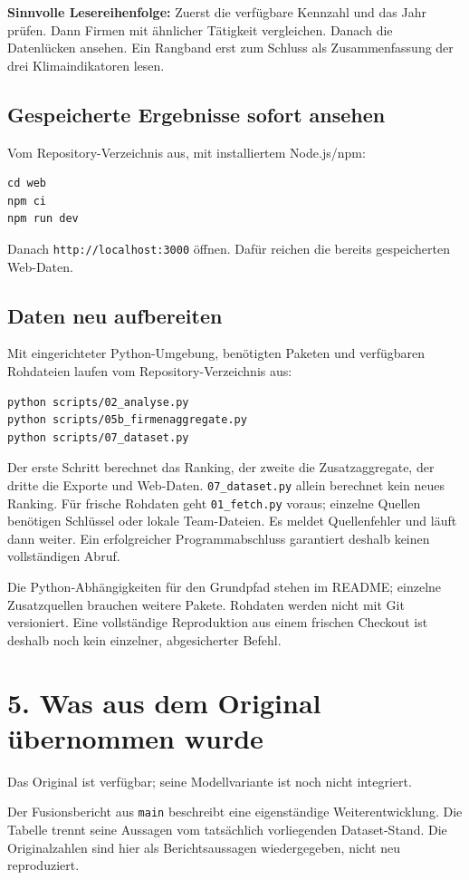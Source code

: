 \documentclass[11pt,a4paper]{article}
\newcommand{\lead}[1]{{\large\sffamily\color{accent}#1}\par}
\newcommand{\page}[2]{\clearpage\section*{#1}\lead{#2}}
\begin{document}
\textbf{Sinnvolle Lesereihenfolge:} Zuerst die verfügbare Kennzahl und das Jahr prüfen. Dann Firmen mit ähnlicher Tätigkeit vergleichen. Danach die Datenlücken ansehen. Ein Rangband erst zum Schluss als Zusammenfassung der drei Klimaindikatoren lesen.

\subsection*{Gespeicherte Ergebnisse sofort ansehen}
Vom Repository-Verzeichnis aus, mit installiertem Node.js/npm:
\begin{verbatim}
cd web
npm ci
npm run dev
\end{verbatim}
Danach \texttt{http://localhost:3000} öffnen. Dafür reichen die bereits gespeicherten Web-Daten.

\subsection*{Daten neu aufbereiten}
Mit eingerichteter Python-Umgebung, benötigten Paketen und verfügbaren Rohdateien laufen vom Repository-Verzeichnis aus:
\begin{verbatim}
python scripts/02_analyse.py
python scripts/05b_firmenaggregate.py
python scripts/07_dataset.py
\end{verbatim}
Der erste Schritt berechnet das Ranking, der zweite die Zusatzaggregate, der dritte die Exporte und Web-Daten. \texttt{07\_dataset.py} allein berechnet kein neues Ranking. Für frische Rohdaten geht \texttt{01\_fetch.py} voraus; einzelne Quellen benötigen Schlüssel oder lokale Team-Dateien. Es meldet Quellenfehler und läuft dann weiter. Ein erfolgreicher Programmabschluss garantiert deshalb keinen vollständigen Abruf.

Die Python-Abhängigkeiten für den Grundpfad stehen im README; einzelne Zusatzquellen brauchen weitere Pakete. Rohdaten werden nicht mit Git versioniert. Eine vollständige Reproduktion aus einem frischen Checkout ist deshalb noch kein einzelner, abgesicherter Befehl.

\page{5. Was aus dem Original übernommen wurde}{Das Original ist verfügbar; seine Modellvariante ist noch nicht integriert.}
Der Fusionsbericht aus \texttt{main} beschreibt eine eigenständige Weiterentwicklung. Die Tabelle trennt seine Aussagen vom tatsächlich vorliegenden Dataset-Stand. Die Originalzahlen sind hier als Berichtsaussagen wiedergegeben, nicht neu reproduziert.
\end{document}
